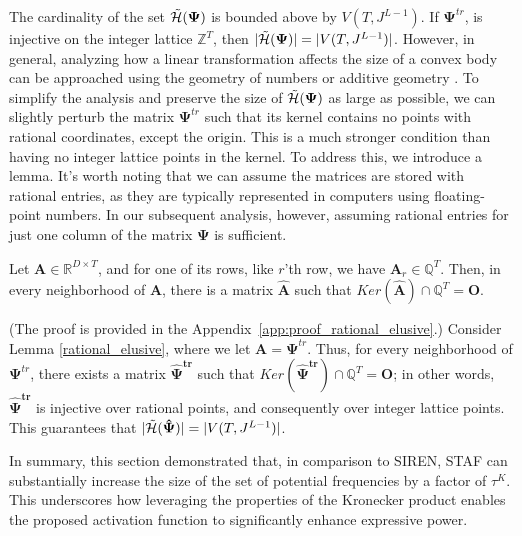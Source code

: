 The cardinality of the set $\Tilde{\mathcal{H}}(\boldsymbol{\Psi})$ is bounded above by $V(T,J^{L-1})$. If $\boldsymbol{\Psi}^{tr}$, is injective on the integer lattice $\mathbb{Z}^T$, then $|\Tilde{\mathcal{H}}(\boldsymbol{\Psi})| = |V(T,J^{L-1})|$. However, in general, analyzing how a linear transformation affects the size of a convex body can be approached using the geometry of numbers \citep{matousek2013lectures} or additive geometry \citep{tao2006additive}. To simplify the analysis and preserve the size of $\Tilde{\mathcal{H}}(\boldsymbol{\Psi})$ as large as possible, we can slightly perturb the matrix $\boldsymbol{\Psi}^{tr}$ such that its kernel contains no points with rational coordinates, except the origin. This is a much stronger condition than having no integer lattice points in the kernel. To address this, we introduce a lemma. It's worth noting that we can assume the matrices are stored with rational entries, as they are typically represented in computers using floating-point numbers. In our subsequent analysis, however, assuming rational entries for just one column of the matrix $\boldsymbol{\Psi}$ is sufficient.
\begin{lemma} \label{rational_elusive}
    Let $\boldsymbol{A}\in\mathbb{R}^{D\times T}$, and for one of its rows, like $r$'th row, we have $\boldsymbol{A}_r\in\mathbb{Q}^T$. Then, in every neighborhood of $\boldsymbol{A}$, there is a matrix $\boldsymbol{\hat{A}}$ such that $Ker(\boldsymbol{\hat{A}})\cap \mathbb{Q}^{T}=\boldsymbol{O}$.
\end{lemma}
(The proof is provided in the Appendix~\ref{app:proof_rational_elusive}.) Consider Lemma \eqref{rational_elusive}, where we let $\boldsymbol{A}=\boldsymbol{\Psi}^{tr}$. Thus, for every neighborhood of $\boldsymbol{\Psi}^{tr}$, there exists a matrix $\boldsymbol{\hat{\Psi}^{tr}}$ such that $Ker(\boldsymbol{\hat{\Psi}^{tr}})\cap \mathbb{Q}^{T}=\boldsymbol{O}$; in other words, $\boldsymbol{\hat{\Psi}^{tr}}$ is injective over rational points, and consequently over integer lattice points. This guarantees that $|\Tilde{\mathcal{H}}(\boldsymbol{\hat{\Psi}})| = |V(T,J^{L-1})|$.

In summary, this section demonstrated that, in comparison to SIREN, STAF can substantially increase the size of the set of potential frequencies by a factor of $\tau^K$. This underscores how leveraging the properties of the Kronecker product enables the proposed activation function to significantly enhance expressive power.